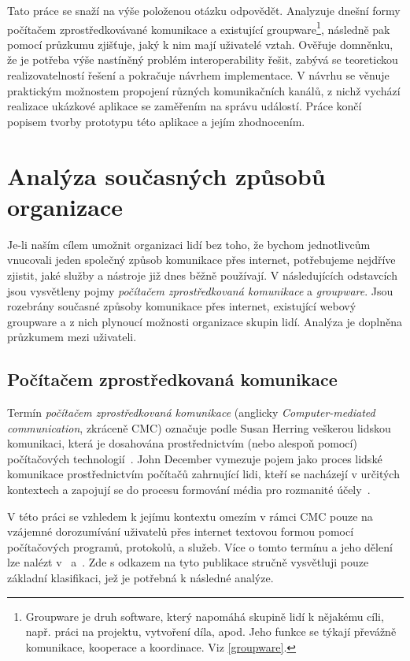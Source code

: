 \documentclass[12pt,oneside,final]{fithesis2}
\begin{document}
Tato práce se snaží na výše položenou otázku odpovědět. Analyzuje dnešní formy počítačem zprostředkovávané komunikace a existující groupware\footnote{Groupware je druh software, který napomáhá skupině lidí k nějakému cíli, např. práci na projektu, vytvoření díla, apod. Jeho funkce se týkají převážně komunikace, kooperace a koordinace. Viz \ref{groupware}.}, následně pak pomocí průzkumu zjišťuje, jaký k nim mají uživatelé vztah. Ověřuje domněnku, že je potřeba výše nastíněný problém interoperability řešit, zabývá se teoretickou realizovatelností řešení a pokračuje návrhem implementace. V návrhu se věnuje praktickým možnostem propojení různých komunikačních kanálů, z nichž vychází realizace ukázkové aplikace se zaměřením na správu událostí. Práce končí popisem tvorby prototypu této aplikace a jejím zhodnocením.



\chapter{Analýza současných způsobů organizace}\label{analysis}
Je-li naším cílem umožnit organizaci lidí bez toho, že bychom jednotlivcům vnucovali jeden společný způsob komunikace přes internet, potřebujeme nejdříve zjistit, jaké služby a nástroje již dnes běžně používají. V následujících odstavcích jsou vysvětleny pojmy \emph{počítačem zprostředkovaná komunikace} a \emph{groupware}. Jsou rozebrány současné způsoby komunikace přes internet, existující webový groupware a z nich plynoucí možnosti organizace skupin lidí. Analýza je doplněna průzkumem mezi uživateli.


\section{Počítačem zprostředkovaná komunikace}\label{cmc}
Termín \emph{počítačem zprostředkovaná komunikace} (anglicky \emph{Computer-mediated communication}, zkráceně CMC) označuje podle Susan Herring veškerou lidskou komunikaci, která je dosahována prostřednictvím (nebo alespoň pomocí) počítačových technologií~\cite{thurlow2004computer}. John December vymezuje pojem jako proces lidské komunikace prostřednictvím počítačů zahrnující lidi, kteří se nacházejí v určitých kontextech a zapojují se do procesu formování média pro rozmanité účely~\cite{december1997notes}.

V této práci se vzhledem k jejímu kontextu omezím v rámci CMC pouze na vzájemné dorozumívání uživatelů přes internet textovou formou pomocí počítačových programů, protokolů, a služeb. Více o tomto termínu a jeho dělení lze nalézt v~\cite{thurlow2004computer} a~\cite{rulik2006computer}. Zde s odkazem na tyto publikace stručně vysvětluji pouze základní klasifikaci, jež je potřebná k následné analýze.
\end{document}
